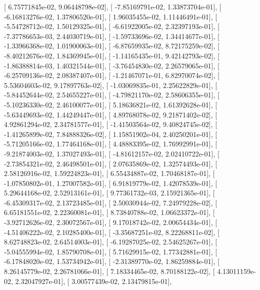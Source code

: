 \documentclass{article}
\begin{document}
       [  6.75771845e-02,   9.06448798e-02],
       [ -7.85169791e-02,   1.33873704e-01],
       [ -6.16813276e-02,   1.37806520e-01],
       [  1.96035455e-02,   1.11446491e-01],
       [ -5.54728712e-02,   1.50129325e-01],
       [ -6.61922005e-02,   2.32397193e-01],
       [ -7.37786653e-03,   2.44030719e-01],
       [ -1.59733696e-02,   1.34414677e-01],
       [ -1.33966368e-02,   1.01900063e-01],
       [ -6.87659935e-02,   8.72175259e-02],
       [ -8.40212676e-02,   1.84369945e-01],
       [ -1.14165435e-01,   9.42142793e-02],
       [ -1.86388814e-03,   1.40321544e-01],
       [ -3.76454830e-02,   2.26579065e-01],
       [ -6.25709136e-02,   2.08387407e-01],
       [ -1.21467071e-01,   6.82970074e-02],
       [  5.53604603e-02,   9.17897763e-02],
       [ -1.03069835e-01,   2.25622829e-01],
       [ -5.84452644e-02,   2.54655227e-01],
       [ -4.79821170e-02,   2.58606355e-01],
       [ -5.10236330e-02,   2.46100077e-01],
       [  5.18636821e-02,   1.61392628e-01],
       [ -5.63449693e-02,   1.44249447e-01],
       [  4.89768078e-02,   9.21871402e-02],
       [  4.92861294e-02,   2.34781577e-01],
       [ -1.41503564e-02,   9.40824745e-02],
       [ -1.41265899e-02,   7.84888326e-02],
       [  1.15851902e-04,   2.40250201e-01],
       [ -5.71205166e-02,   1.77464168e-01],
       [  4.48883395e-02,   1.76992991e-01],
       [ -9.21874003e-02,   1.37027493e-01],
       [ -4.81612157e-02,   2.02410722e-01],
       [ -2.73854321e-02,   2.46498501e-01],
       [  2.07635869e-02,   1.32574493e-01],
       [  2.58126916e-02,   1.59224823e-01],
       [  6.55434887e-02,   1.70468187e-01],
       [ -1.07850802e-01,   1.27007582e-01],
       [  6.91819779e-02,   1.42078539e-01],
       [  5.29644168e-02,   2.52913161e-01],
       [  9.77361732e-03,   2.15921365e-01],
       [ -6.45309317e-02,   2.13723485e-01],
       [  2.50030944e-02,   7.24979228e-02],
       [  6.65181551e-02,   2.22360081e-01],
       [  8.73840788e-02,   1.06623372e-01],
       [ -3.92712626e-02,   2.30072567e-01],
       [  9.17018742e-02,   2.00654434e-01],
       [ -4.51406222e-02,   2.10285400e-01],
       [ -3.35687251e-02,   8.22268811e-02],
       [  8.62748823e-02,   2.64514003e-01],
       [ -6.19287025e-02,   2.54625267e-01],
       [ -5.04555994e-02,   1.85790708e-01],
       [  5.71629915e-02,   1.77342881e-01],
       [ -6.17848020e-02,   1.53734942e-01],
       [ -2.31389770e-02,   1.86259884e-01],
       [  8.26145779e-02,   2.26781066e-01],
       [  7.18334465e-02,   8.70188122e-02],
       [  4.13011159e-02,   2.32047927e-01],
       [  3.00577439e-02,   2.13479815e-01],
\end{document}
